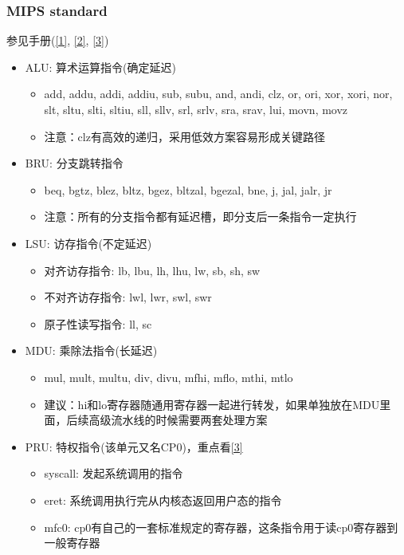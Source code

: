 \documentclass[lang=cn,11pt,a4paper]{elegantpaper}
\begin{document}
\subsubsection{MIPS standard}
参见手册(\href{run:../manuals/MIPS_Vol1.pdf}{[1]}, \href{run:../manuals/MIPS_Vol2.pdf}{[2]}, \href{run:../manuals/MIPS_Vol3.pdf}{[3]})
\begin{itemize}
\item ALU: 算术运算指令(确定延迟)
  \begin{itemize}
  \item add, addu, addi, addiu, sub, subu, and, andi, clz, or, ori, xor, xori, nor, slt, sltu, slti, sltiu, sll, sllv, srl, srlv, sra, srav, lui, movn, movz
  \item 注意：clz有高效的递归，采用低效方案容易形成关键路径
  \end{itemize}
\item BRU: 分支跳转指令
  \begin{itemize}
  \item beq, bgtz, blez, bltz, bgez, bltzal, bgezal, bne, j, jal, jalr, jr
  \item 注意：所有的分支指令都有延迟槽，即分支后一条指令一定执行
  \end{itemize}
\item LSU: 访存指令(不定延迟)
  \begin{itemize}
  \item 对齐访存指令: lb, lbu, lh, lhu, lw, sb, sh, sw
  \item 不对齐访存指令: lwl, lwr, swl, swr
  \item 原子性读写指令: ll, sc
  \end{itemize}
\item MDU: 乘除法指令(长延迟)
  \begin{itemize}
  \item mul, mult, multu, div, divu, mfhi, mflo, mthi, mtlo
  \item 建议：hi和lo寄存器随通用寄存器一起进行转发，如果单独放在MDU里面，后续高级流水线的时候需要两套处理方案
  \end{itemize}
\item PRU: 特权指令(该单元又名CP0)，重点看\href{run:../manuals/MIPS_Vol3.pdf}{[3]}
  \begin{itemize}
  \item syscall: 发起系统调用的指令
  \item eret: 系统调用执行完从内核态返回用户态的指令
  \item mfc0: cp0有自己的一套标准规定的寄存器，这条指令用于读cp0寄存器到一般寄存器

\end{itemize}
\end{itemize}
\end{document}
